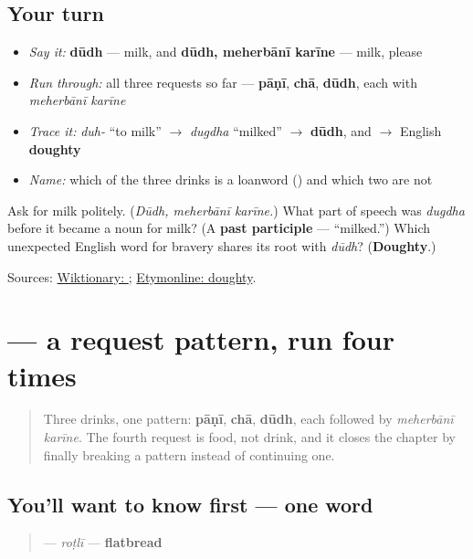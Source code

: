 \subsection*{Your turn}
\begin{itemize}
\raggedright
  \item \emph{Say it:} \textbf{dūdh} — milk, and \textbf{dūdh, meherbānī karīne} — milk, please
  \item \emph{Run through:} all three requests so far — \textbf{pāṇī}, \textbf{chā}, \textbf{dūdh}, each with \emph{meherbānī karīne}
  \item \emph{Trace it:} \emph{duh-} \textquotedblleft{}to milk\textquotedblright{} $\to$ \emph{dugdha} \textquotedblleft{}milked\textquotedblright{} $\to$ \textbf{dūdh}, and $\to$ English \textbf{doughty}
  \item \emph{Name:} which of the three drinks is a loanword (\textbf{}) and which two are not
\end{itemize}

\begin{tcolorbox}[breakable,colback=teal!4,colframe=teal!35!black,title={Before you move on}]
Ask for milk politely. (\emph{Dūdh, meherbānī karīne.}) What part of speech was \emph{dugdha} before it became a noun for milk? (A \textbf{past participle} — \textquotedblleft{}milked.\textquotedblright{}) Which unexpected English word for bravery shares its root with \emph{dūdh}? (\textbf{Doughty}.)

Sources: \href{https://en.wiktionary.org/wiki/\%E0\%AA\%A6\%E0\%AB\%82\%E0\%AA\%A7}{Wiktionary: }; \href{https://www.etymonline.com/word/doughty}{Etymonline: doughty}.
\end{tcolorbox}
\section[roṭlī]{ — a request pattern, run four times}

\label{lesson:GU-C10-rotli}



\begin{quote}
Three drinks, one pattern: \textbf{pāṇī}, \textbf{chā}, \textbf{dūdh}, each followed by \emph{meherbānī karīne}. The fourth request is food, not drink, and it closes the chapter by finally breaking a pattern instead of continuing one.
\end{quote}

\subsection*{You'll want to know first — one word}
\begin{quote}
\textbf{} — \emph{roṭlī} — \textbf{flatbread}
\end{quote}

